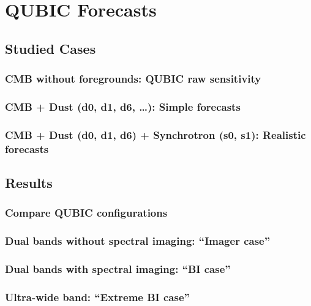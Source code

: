 \documentclass[../../thesis.tex]{subfiles}
\begin{document}
\chapter{QUBIC Forecasts} \label{chap:forecast}

\minitoc

\section{Studied Cases}

\subsection{CMB without foregrounds: QUBIC raw sensitivity}

\subsection{CMB + Dust (d0, d1, d6, \dots): Simple forecasts}

\subsection{CMB + Dust (d0, d1, d6) + Synchrotron (s0, s1): Realistic forecasts}

\section{Results}

\subsection{Compare QUBIC configurations} \label{sub:design_comparison}

\subsection{Dual bands without spectral imaging: \enquote{Imager case}}

\subsection{Dual bands with spectral imaging: \enquote{BI case}}

\subsection{Ultra-wide band: \enquote{Extreme BI case}}
\end{document}
